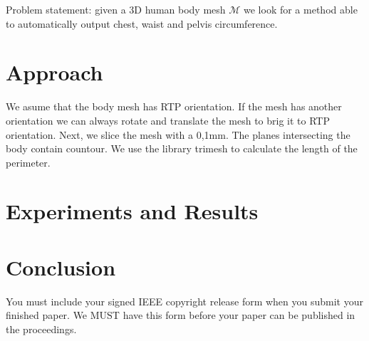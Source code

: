 \documentclass[10pt,twocolumn,letterpaper]{article}
\begin{document}
Problem statement: given a 3D human body mesh $\mathcal{M}$ we look for a method able to automatically output chest, waist and pelvis circumference.

\section{Approach}
We asume that the body mesh has RTP orientation. If the mesh has another orientation we can always rotate and translate the mesh to brig it to RTP orientation. Next, we slice the mesh with a 0,1mm. The planes intersecting the body contain countour. We use the library trimesh to calculate the length of the perimeter. 

\section{Experiments and Results}


\section{Conclusion}

You must include your signed IEEE copyright release form when you submit
your finished paper. We MUST have this form before your paper can be
published in the proceedings.

{\small


}
\end{document}
